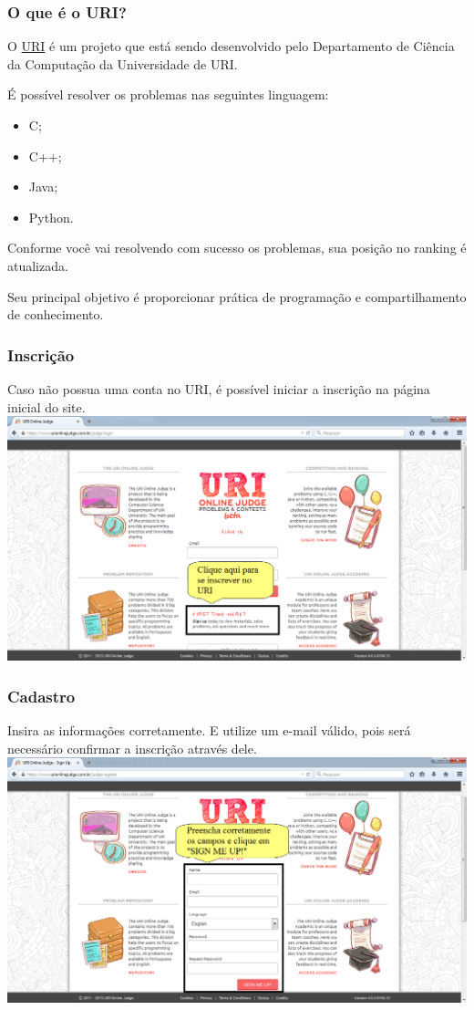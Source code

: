 \begin{frame}
\label{tool:uri}
 \frametitle{O que é o URI?}
 O \href{https://www.urionlinejudge.com.br/}{URI} é um projeto que está sendo desenvolvido
 pelo Departamento de Ciência da Computação da Universidade de URI.
 
 É possível resolver os problemas nas seguintes linguagem:
 \begin{itemize}
  \item C;
  \item C++;
  \item Java;
  \item Python.
 \end{itemize}
 Conforme você vai resolvendo com sucesso os problemas, sua posição no ranking é atualizada.
 
 Seu principal objetivo é proporcionar prática de programação e compartilhamento de conhecimento.
\end{frame}

\begin{frame}
\frametitle{Inscrição}
Caso não possua uma conta no URI, é possível iniciar a inscrição na página inicial do site.
 \includegraphics[scale=.28]{uri/Imagens/01Login.png}
\end{frame}

\begin{frame}
 \frametitle{Cadastro}
 Insira as informações corretamente. E utilize um e-mail válido,
 pois será necessário confirmar a inscrição através dele.
 \includegraphics[scale=.28]{uri/Imagens/02Cadastro.png}
\end{frame}

